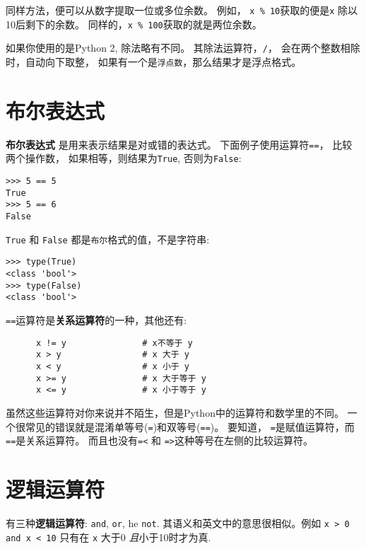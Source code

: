 \documentclass[10pt]{book}
\begin{document}
同样方法，便可以从数字提取一位或多位余数。
例如， {\tt x \% 10}获取的便是{\tt x} 除以10后剩下的余数。
同样的，{\tt x \% 100}获取的就是两位余数。

如果你使用的是Python 2, 除法略有不同。
其除法运算符，\verb"/"， 会在两个整数相除时，自动向下取整，
如果有一个是{\tt 浮点数}，那么结果才是浮点格式。


\section{布尔表达式}

{\bf 布尔表达式} 是用来表示结果是对或错的表达式。
下面例子使用运算符{\tt ==}， 比较两个操作数，
如果相等，则结果为{\tt True}, 否则为{\tt False}:

\begin{verbatim}
>>> 5 == 5
True
>>> 5 == 6
False
\end{verbatim}
%
{\tt True} 和 {\tt False} 都是{\tt  布尔}格式的值，不是字符串:

\begin{verbatim}
>>> type(True)
<class 'bool'>
>>> type(False)
<class 'bool'>
\end{verbatim}
%
 {\tt ==}运算符是{\bf 关系运算符}的一种，其他还有:

\begin{verbatim}
      x != y               # x不等于 y
      x > y                # x 大于 y
      x < y                # x 小于 y
      x >= y               # x 大于等于 y
      x <= y               # x 小于等于 y
\end{verbatim}
%
虽然这些运算符对你来说并不陌生，但是Python中的运算符和数学里的不同。
一个很常见的错误就是混淆单等号({\tt =})和双等号({\tt ==})。
要知道， {\tt =}是赋值运算符，而{\tt ==}是关系运算符。
而且也没有{\tt =<} 和 {\tt =>}这种等号在左侧的比较运算符。


\section {逻辑运算符}

有三种{\bf 逻辑运算符}: {\tt and}, {\tt or}, he  {\tt not}.
其语义和英文中的意思很相似。例如
{\tt x > 0 and x < 10} 只有在 {\tt x} 大于0
{\em 且}小于10时才为真.
\end{document}
